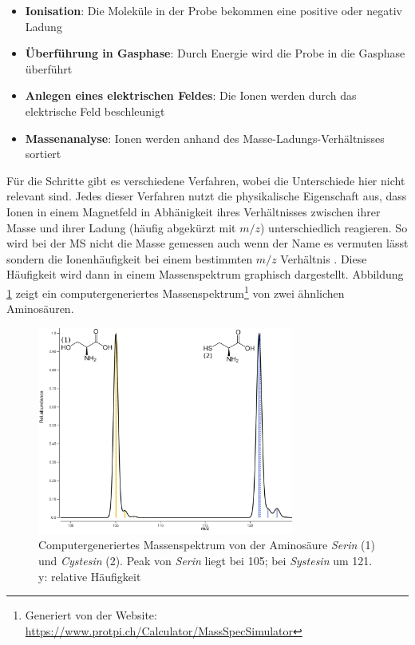 \documentclass[a4paper, 12pt]{article}
\newcommand{\gerquot}[1]{\glqq#1\grqq}
\newcommand{\dashAndSpace}{\textendash \space}
\newcommand{\dashAndSpaceSeq}[1]{\dashAndSpace#1 \dashAndSpace}
\newcommand{\massCharge}{$ m/z $ }
\begin{document}
\begin{itemize}
   \item \textbf{Ionisation}: Die Moleküle in der Probe bekommen eine positive oder negativ Ladung
   \item \textbf{Überführung in Gasphase}: Durch Energie wird die Probe in die Gasphase überführt
   \item \textbf{Anlegen eines elektrischen Feldes}: Die Ionen werden durch das elektrische Feld beschleunigt
   \item \textbf{Massenanalyse}: Ionen werden anhand des Masse-Ladungs-Verhältnisses \gerquot{sortiert}
\end{itemize}

Für die Schritte gibt es verschiedene Verfahren, wobei die Unterschiede hier nicht relevant sind. Jedes dieser Verfahren nutzt die physikalische Eigenschaft aus, dass Ionen in einem Magnetfeld in Abhänigkeit ihres Verhältnisses zwischen ihrer Masse und ihrer Ladung (häufig abgekürzt mit $ m/z $) unterschiedlich reagieren. So wird bei der MS nicht die Masse gemessen \dashAndSpaceSeq{auch wenn der Name es vermuten lässt} sondern die Ionenhäufigkeit bei einem bestimmten \massCharge Verhältnis \cite[140]{Glish2003}. Diese Häufigkeit wird dann in einem Massenspektrum graphisch dargestellt. Abbildung \ref{fig:Sim_Mass_Spec} zeigt ein computergeneriertes Massenspektrum\footnote{Generiert von der Website: \url{https://www.protpi.ch/Calculator/MassSpecSimulator}} von zwei ähnlichen Aminosäuren.

\begin{figure}[H]
   \includegraphics[width=0.75\textwidth]{./Resources/Simulated_Mass_Spectrum.png}
   \centering
   \caption{Computergeneriertes Massenspektrum von der Aminosäure \emph{Serin} (1) und \emph{Cystesin} (2). Peak von \emph{Serin} liegt bei 105; bei \emph{Systesin} um 121. y: relative Häufigkeit}
   \label{fig:Sim_Mass_Spec}
\end{figure}
\end{document}

